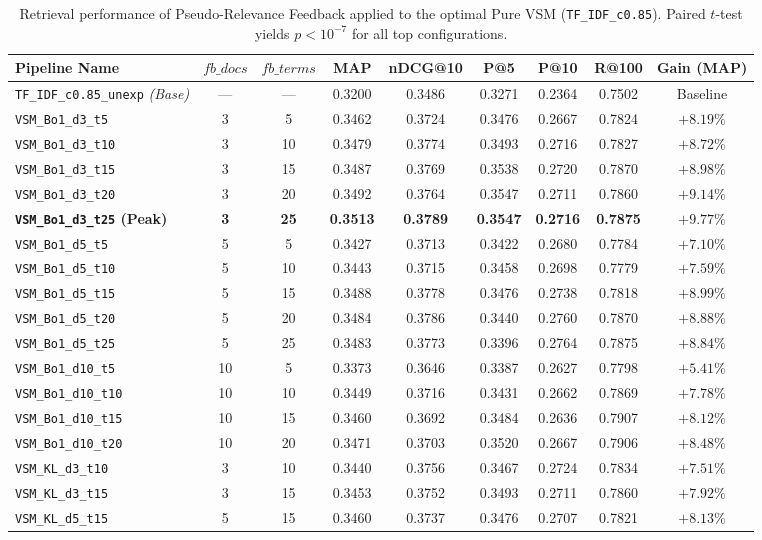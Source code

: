 \documentclass[10pt, a4paper]{article}
\begin{document}
\begin{table}[H]
\centering
\small
\begin{tabular}{@{}lcccccccc@{}}
\toprule
\textbf{Pipeline Name} & $fb\_docs$ & $fb\_terms$ & \textbf{MAP} & \textbf{nDCG@10} & \textbf{P@5} & \textbf{P@10} & \textbf{R@100} & \textbf{Gain (MAP)} \\ \midrule
\texttt{TF\_IDF\_c0.85\_unexp} \textit{(Base)} & --- & --- & 0.3200 & 0.3486 & 0.3271 & 0.2364 & 0.7502 & Baseline \\ \midrule
\texttt{VSM\_Bo1\_d3\_t5} & 3 & 5 & 0.3462 & 0.3724 & 0.3476 & 0.2667 & 0.7824 & $+8.19\%$ \\
\texttt{VSM\_Bo1\_d3\_t10} & 3 & 10 & 0.3479 & 0.3774 & 0.3493 & 0.2716 & 0.7827 & $+8.72\%$ \\
\texttt{VSM\_Bo1\_d3\_t15} & 3 & 15 & 0.3487 & 0.3769 & 0.3538 & 0.2720 & 0.7870 & $+8.98\%$ \\
\texttt{VSM\_Bo1\_d3\_t20} & 3 & 20 & 0.3492 & 0.3764 & 0.3547 & 0.2711 & 0.7860 & $+9.14\%$ \\
\textbf{\texttt{VSM\_Bo1\_d3\_t25} (Peak)} & \textbf{3} & \textbf{25} & \textbf{0.3513} & \textbf{0.3789} & \textbf{0.3547} & \textbf{0.2716} & \textbf{0.7875} & $\mathbf{+9.77\%}$ \\ \midrule
\texttt{VSM\_Bo1\_d5\_t5} & 5 & 5 & 0.3427 & 0.3713 & 0.3422 & 0.2680 & 0.7784 & $+7.10\%$ \\
\texttt{VSM\_Bo1\_d5\_t10} & 5 & 10 & 0.3443 & 0.3715 & 0.3458 & 0.2698 & 0.7779 & $+7.59\%$ \\
\texttt{VSM\_Bo1\_d5\_t15} & 5 & 15 & 0.3488 & 0.3778 & 0.3476 & 0.2738 & 0.7818 & $+8.99\%$ \\
\texttt{VSM\_Bo1\_d5\_t20} & 5 & 20 & 0.3484 & 0.3786 & 0.3440 & 0.2760 & 0.7870 & $+8.88\%$ \\
\texttt{VSM\_Bo1\_d5\_t25} & 5 & 25 & 0.3483 & 0.3773 & 0.3396 & 0.2764 & 0.7875 & $+8.84\%$ \\ \midrule
\texttt{VSM\_Bo1\_d10\_t5} & 10 & 5 & 0.3373 & 0.3646 & 0.3387 & 0.2627 & 0.7798 & $+5.41\%$ \\
\texttt{VSM\_Bo1\_d10\_t10} & 10 & 10 & 0.3449 & 0.3716 & 0.3431 & 0.2662 & 0.7869 & $+7.78\%$ \\
\texttt{VSM\_Bo1\_d10\_t15} & 10 & 15 & 0.3460 & 0.3692 & 0.3484 & 0.2636 & 0.7907 & $+8.12\%$ \\
\texttt{VSM\_Bo1\_d10\_t20} & 10 & 20 & 0.3471 & 0.3703 & 0.3520 & 0.2667 & 0.7906 & $+8.48\%$ \\ \midrule
\texttt{VSM\_KL\_d3\_t10} & 3 & 10 & 0.3440 & 0.3756 & 0.3467 & 0.2724 & 0.7834 & $+7.51\%$ \\
\texttt{VSM\_KL\_d3\_t15} & 3 & 15 & 0.3453 & 0.3752 & 0.3493 & 0.2711 & 0.7860 & $+7.92\%$ \\
\texttt{VSM\_KL\_d5\_t15} & 5 & 15 & 0.3460 & 0.3737 & 0.3476 & 0.2707 & 0.7821 & $+8.13\%$ \\ \bottomrule
\end{tabular}
\caption{Retrieval performance of Pseudo-Relevance Feedback applied to the optimal Pure VSM (\texttt{TF\_IDF\_c0.85}). Paired $t$-test yields $p < 10^{-7}$ for all top configurations.}
\label{tab:results_vsm_qe}
\end{table}
\end{document}
